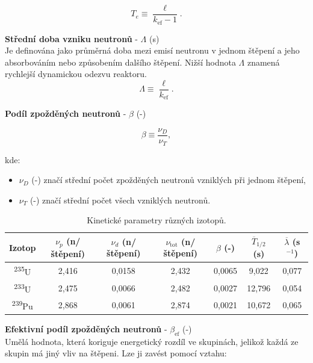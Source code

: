 \begin{equation}
  \boxed{
  T_e \equiv \dfrac{\ell}{k_{\text{ef}} - 1}.
  \label{perioda}}
\end{equation}

\textbf{Střední doba vzniku neutronů} - $\Lambda$ (s) \\
Je definována jako průměrná doba mezi emisí neutronu v jednom štěpení a jeho absorbováním nebo způsobením dalšího štěpení. Nižší hodnota $\Lambda$ znamená rychlejší dynamickou odezvu reaktoru.
\begin{equation}
  \boxed{
  \Lambda \equiv \dfrac{\ell}{k_{\text{ef}}}.
  \label{stredni_doba_vzniku}}
\end{equation}

\textbf{Podíl zpožděných neutronů} - $\beta$ (-)

\begin{equation}
  \boxed{
  \beta \equiv \dfrac{\nu_D}{\nu_T},
  \label{zpozdenky}}
\end{equation}

kde:

\begin{itemize}
  \item $\nu_D$ (-) značí střední počet zpožděných neutronů vzniklých při jednom štěpení,
  \item $\nu_T$ (-) značí střední počet všech vzniklých neutronů.
\end{itemize}

\begin{table}[h!]
\centering
\caption{Kinetické parametry různých izotopů.}
\label{tab:kinetic_parameters}
\begin{tabular}{ccccccc}
\toprule
\textbf{Izotop} & $\nu_p$ (n/štěpení) & $\nu_d$ (n/štěpení) & $\nu_\text{tot}$ (n/štěpení) & $\beta$ (-) & $\overline{T}_{1/2}$ (s) & $\overline{\lambda}$ (s$^{-1}$) \\ \midrule
\textsuperscript{235}U & 2,416 & 0,0158 & 2,432 & 0,0065 & 9,022 & 0,077 \\ 
\textsuperscript{233}U & 2,475 & 0,0066 & 2,482 & 0,0027 & 12,796 & 0,054 \\ 
\textsuperscript{239}Pu & 2,868 & 0,0061 & 2,874 & 0,0021 & 10,672 & 0,065 \\ \bottomrule
\end{tabular}
\end{table}

\textbf{Efektivní podíl zpožděných neutronů} - $\beta_\text{ef}$ (-)\\
Umělá hodnota, která koriguje energetický rozdíl ve skupinách, jelikož každá ze skupin má jiný vliv na štěpeni. Lze ji zavést pomocí vztahu:

